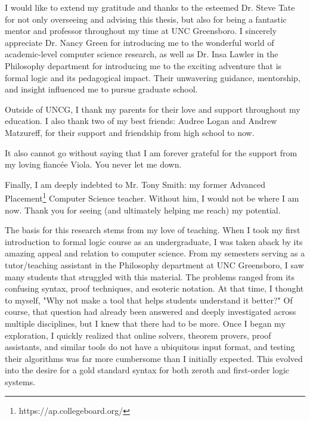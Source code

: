 \documentclass[ms]{uncgdissertationexp2}
\theoremstyle{plain}
\theoremstyle{definition}
\theoremstyle{remark}
\begin{document}
\begin{acknowledgments}
	I would like to extend my gratitude and thanks to the esteemed Dr. Steve Tate for not only overseeing and advising this thesis, but also for being a fantastic mentor and professor throughout my time at UNC Greensboro. I sincerely appreciate Dr. Nancy Green for introducing me to the wonderful world of academic-level computer science research, as well as Dr. Insa Lawler in the Philosophy department for introducing me to the exciting adventure that is formal logic and its pedagogical impact. Their unwavering guidance, mentorship, and insight influenced me to pursue graduate school.
	
	Outside of UNCG, I thank my parents for their love and support throughout my education. I also thank two of my best friends: Audree Logan and Andrew Matzureff, for their support and friendship from high school to now.
	
	It also cannot go without saying that I am forever grateful for the support from my loving fiancée Viola. You never let me down.
	
	Finally, I am deeply indebted to Mr. Tony Smith: my former Advanced Placement\footnote{https://ap.collegeboard.org/} Computer Science teacher. Without him, I would not be where I am now. Thank you for seeing (and ultimately helping me reach) my potential.
\end{acknowledgments}

\begin{preface}
	The basis for this research stems from my love of teaching. When I took my first introduction to formal logic course as an undergraduate, I was taken aback by its amazing appeal and relation to computer science. From my semesters serving as a tutor/teaching assistant in the Philosophy department at UNC Greensboro, I saw many students that struggled with this material. The problems ranged from its confusing syntax, proof techniques, and esoteric notation. At that time, I thought to myself, "Why not make a tool that helps students understand it better?" Of course, that question had already been answered and deeply investigated across multiple disciplines, but I knew that there had to be more. Once I began my exploration, I quickly realized that online solvers, theorem provers, proof assistants, and similar tools do not have a ubiquitous input format, and testing their algorithms was far more cumbersome than I initially expected. This evolved into the desire for a gold standard syntax for both zeroth and first-order logic systems.
\end{preface}
\end{document}
